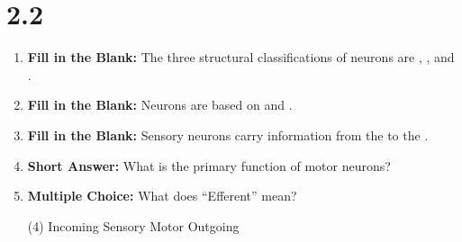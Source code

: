 \section*{2.2}
\begin{enumerate}[label=\textbf{Q2.2.\arabic*}]

      \item \textbf{Fill in the Blank:} The three structural classifications of neurons are \underline{\hspace{3cm}}, \underline{\hspace{3cm}}, and \underline{\hspace{3cm}}. \\



      \item \textbf{Fill in the Blank:} Neurons are based on \underline{\hspace{3cm}} and \underline{\hspace{3cm}}. \\


      \item \textbf{Fill in the Blank:} Sensory neurons carry information from the \underline{\hspace{3cm}} to the \underline{\hspace{3cm}}. \\

      \item \textbf{Short Answer:} What is the primary function of motor neurons? \\

      \item \textbf{Multiple Choice:} What does ``Efferent'' mean?
            \begin{tasks}[label=\textcolor{\documentTheme}{(\Alph*)}, item-format=\color{\documentTheme}, label-width=1.5em, item-indent=1.7em](4)
                  \task Incoming
                  \task Sensory
                  \task Motor
                  \task Outgoing
            \end{tasks}

\end{enumerate}
\squigglyline


